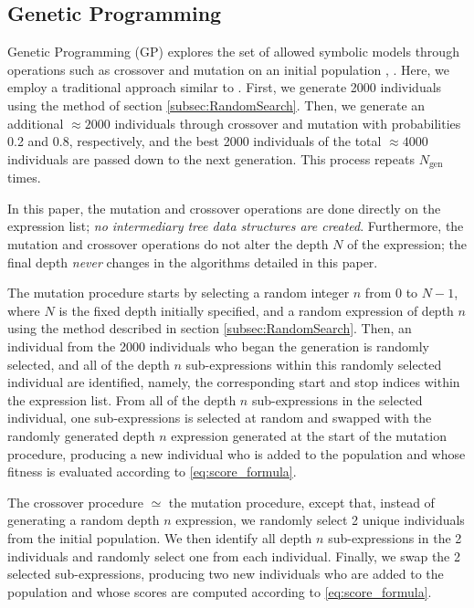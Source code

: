 \documentclass[runningheads]{llncs}
\begin{document}
\subsection{Genetic Programming} \label{subsec:GeneticProgramming}
Genetic Programming (GP) explores the set of allowed symbolic models through operations such as crossover and mutation on an initial population \cite{manti2023discovering} \cite{PoliFieldGuideGP}, \cite{Koza1994}. Here, we employ a traditional approach similar to \cite{manti2023discovering}. First, we generate 2000 individuals using the method of section \ref{subsec:RandomSearch}. Then, we generate an additional $\approx 2000$ individuals through crossover and mutation with probabilities 0.2 and 0.8, respectively, and the best 2000 individuals of the total $\approx 4000$ individuals are passed down to the next generation. This process repeats $N_{\mathrm{gen}}$ times.
\par In this paper, the mutation and crossover operations are done directly on the expression list; \emph{no intermediary tree data structures are created}. Furthermore, the mutation and crossover operations do not alter the depth $N$ of the expression; the final depth \emph{never} changes in the algorithms detailed in this paper. 
\par The mutation procedure starts by selecting a random integer $n$ from $0$ to $N-1$, where $N$ is the fixed depth initially specified, and a random expression of depth $n$ using the method described in section \ref{subsec:RandomSearch}. Then, an individual from the 2000 individuals who began the generation is randomly selected, and all of the depth $n$ sub-expressions within this randomly selected individual are identified, namely, the corresponding start and stop indices within the expression list. From all of the depth $n$ sub-expressions in the selected individual, one sub-expressions is selected at random and swapped with the randomly generated depth $n$ expression generated at the start of the mutation procedure, producing a new individual who is added to the population and whose fitness is evaluated according to \ref{eq:score_formula}.
\par The crossover procedure $\simeq$ the mutation procedure, except that, instead of generating a random depth $n$ expression, we randomly select 2 unique individuals from the initial population. We then identify all depth $n$ sub-expressions in the 2 individuals and randomly select one from each individual. Finally, we swap the 2 selected sub-expressions, producing two new individuals who are added to the population and whose scores are computed according to \ref{eq:score_formula}.
\end{document}
